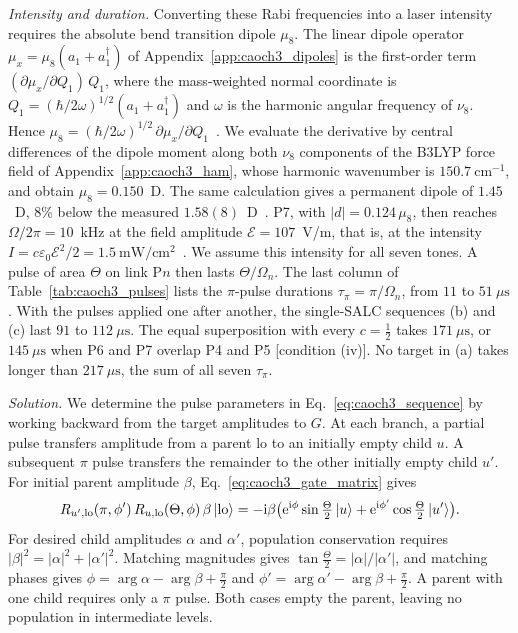 \emph{Intensity and duration.} Converting these Rabi frequencies into a laser intensity requires the absolute bend transition dipole $\mu_8$. The linear dipole operator $\mu_x=\mu_8(a_1+a_1^\dagger)$ of Appendix~\ref{app:caoch3_dipoles} is the first-order term $(\partial\mu_x/\partial Q_1)\,Q_1$, where the mass-weighted normal coordinate is $Q_1=(\hbar/2\omega)^{1/2}(a_1+a_1^\dagger)$ and $\omega$ is the harmonic angular frequency of $\nu_8$. Hence $\mu_8=(\hbar/2\omega)^{1/2}\,\partial\mu_x/\partial Q_1$~\cite{Herzberg1945,BunkerJensen2006}. We evaluate the derivative by central differences of the dipole moment along both $\nu_8$ components of the B3LYP force field of Appendix~\ref{app:caoch3_ham}, whose harmonic wavenumber is $150.7\ \mathrm{cm^{-1}}$, and obtain $\mu_8=0.150$~D. The same calculation gives a permanent dipole of $1.45$~D, $8\%$ below the measured $1.58(8)$~D~\cite{Namiki1998}. P7, with $|d|=0.124\,\mu_8$, then reaches $\Omega/2\pi=10$~kHz at the field amplitude $\mathcal E=107$~V/m, that is, at the intensity $I=c\varepsilon_0\mathcal E^2/2=1.5\ \mathrm{mW/cm^2}$~\cite{Foot2005}. We assume this intensity for all seven tones. A pulse of area $\Theta$ on link P$n$ then lasts $\Theta/\Omega_n$. The last column of Table~\ref{tab:caoch3_pulses} lists the $\pi$-pulse durations $\tau_\pi=\pi/\Omega_n$, from $11$ to $51~\mu\mathrm{s}$. With the pulses applied one after another, the single-SALC sequences (b) and (c) last $91$ to $112~\mu\mathrm{s}$. The equal superposition with every $c=\tfrac12$ takes $171~\mu\mathrm{s}$, or $145~\mu\mathrm{s}$ when P6 and P7 overlap P4 and P5 [condition (iv)]. No target in (a) takes longer than $217~\mu\mathrm{s}$, the sum of all seven $\tau_\pi$.

\emph{Solution.} We determine the pulse parameters in Eq.~\eqref{eq:caoch3_sequence} by working backward from the target amplitudes to $G$. At each branch, a partial pulse transfers amplitude from a parent $\mathrm{lo}$ to an initially empty child $u$. A subsequent $\pi$ pulse transfers the remainder to the other initially empty child $u'$. For initial parent amplitude $\beta$, Eq.~\eqref{eq:caoch3_gate_matrix} gives
\begin{equation}
R_{u',\mathrm{lo}}(\pi,\phi')\,R_{u,\mathrm{lo}}(\Theta,\phi)\,\beta\ket{\mathrm{lo}}=-\mathrm{i}\beta\bigl(\mathrm{e}^{\mathrm{i}\phi}\sin\tfrac\Theta2\ket{u}+\mathrm{e}^{\mathrm{i}\phi'}\cos\tfrac\Theta2\ket{u'}\bigr).
\label{eq:caoch3_split}
\end{equation}
For desired child amplitudes $\alpha$ and $\alpha'$, population conservation requires $|\beta|^2=|\alpha|^2+|\alpha'|^2$. Matching magnitudes gives $\tan\tfrac\Theta2=|\alpha|/|\alpha'|$, and matching phases gives $\phi=\arg\alpha-\arg\beta+\tfrac\pi2$ and $\phi'=\arg\alpha'-\arg\beta+\tfrac\pi2$. A parent with one child requires only a $\pi$ pulse. Both cases empty the parent, leaving no population in intermediate levels.

